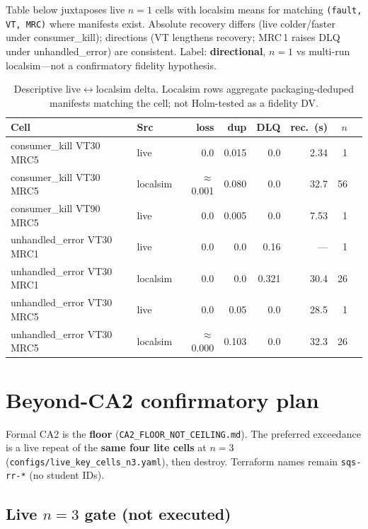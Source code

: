 Table below juxtaposes live $n{=}1$ cells with localsim means for matching \texttt{(fault, VT, MRC)} where manifests exist. Absolute recovery differs (live colder/faster under consumer\_kill); directions (VT lengthens recovery; MRC\,1 raises DLQ under unhandled\_error) are consistent. Label: \textbf{directional}, $n{=}1$ vs multi-run localsim---not a confirmatory fidelity hypothesis.

\begin{table}[h]
\centering
\small
\begin{tabular}{llrrrrrr}
\hline
\textbf{Cell} & \textbf{Src} & \textbf{loss} & \textbf{dup} & \textbf{DLQ} & \textbf{rec.\ (s)} & \textbf{$n$} \\
\hline
consumer\_kill VT30 MRC5 & live & 0.0 & 0.015 & 0.0 & 2.34 & 1 \\
consumer\_kill VT30 MRC5 & localsim & $\approx$0.001 & 0.080 & 0.0 & 32.7 & 56 \\
consumer\_kill VT90 MRC5 & live & 0.0 & 0.005 & 0.0 & 7.53 & 1 \\
unhandled\_error VT30 MRC1 & live & 0.0 & 0.0 & 0.16 & --- & 1 \\
unhandled\_error VT30 MRC1 & localsim & 0.0 & 0.0 & 0.321 & 30.4 & 26 \\
unhandled\_error VT30 MRC5 & live & 0.0 & 0.05 & 0.0 & 28.5 & 1 \\
unhandled\_error VT30 MRC5 & localsim & $\approx$0.000 & 0.103 & 0.0 & 32.3 & 26 \\
\hline
\end{tabular}
\caption{Descriptive live$\leftrightarrow$localsim delta. Localsim rows aggregate packaging-deduped manifests matching the cell; not Holm-tested as a fidelity DV.}
\end{table}

\section{Beyond-CA2 confirmatory plan}

Formal CA2 is the \textbf{floor} (\texttt{CA2\_FLOOR\_NOT\_CEILING.md}). The preferred exceedance is a live repeat of the \textbf{same four lite cells} at $n{=}3$ (\texttt{configs/live\_key\_cells\_n3.yaml}), then destroy. Terraform names remain \texttt{sqs-rr-*} (no student IDs).

\subsection{Live $n{=}3$ gate (not executed)}

